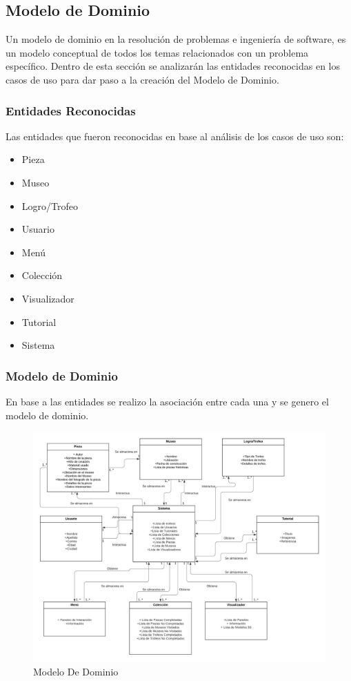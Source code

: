 \subsection{Modelo de Dominio}
Un modelo de dominio en la resolución de problemas e ingeniería de software, es un modelo conceptual de todos los temas relacionados con un problema específico. Dentro de esta sección se analizarán las entidades reconocidas en los casos de uso para dar paso a la creación del Modelo de Dominio.

\subsubsection{Entidades Reconocidas}
Las entidades que fueron reconocidas en base al análisis de los casos de uso son:

\begin{itemize}
\item Pieza
\item Museo
\item Logro/Trofeo
\item Usuario
\item Menú
\item Colección
\item Visualizador
\item Tutorial
\item Sistema
\end{itemize}


\subsubsection{Modelo de Dominio}
En base a las entidades se realizo la asociación entre cada una y se genero el modelo de dominio.

\begin{figure}[H]
\centerline{\includegraphics[width=15cm]{imgs/ModeloDeDominio.png}}
\caption{Modelo De Dominio}
\label{ModeloDom}
\end{figure}

